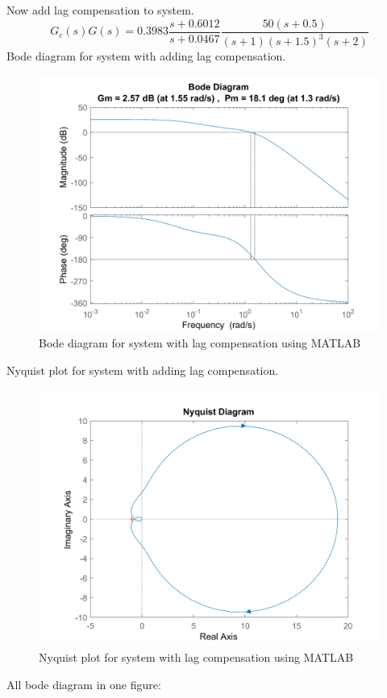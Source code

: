 Now add lag compensation to system.
$$
G_c(s)G(s) = 0.3983 \dfrac{s + 0.6012}{s + 0.0467}\dfrac{50(s+0.5)}{(s+1)(s+1.5)^{3}(s+2)}
$$
Bode diagram for system with adding lag compensation.
\begin{figure}[H]
	\caption{Bode diagram for system with lag compensation using MATLAB}
	\centering
	\includegraphics[width=12cm]{../Figure/Q1/b/new_margin.png}
\end{figure}
Nyquist plot for system with adding lag compensation.
\begin{figure}[H]
	\caption{Nyquist plot for system with lag compensation using MATLAB}
	\centering
	\includegraphics[width=12cm]{../Figure/Q1/b/new_nyquist.png}
\end{figure}
All bode diagram in one figure:
